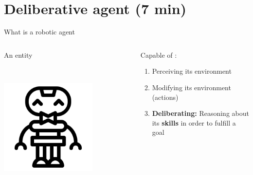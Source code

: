 \section{Deliberative agent (7 min)}

\begin{frame}{What is a robotic agent}

    \begin{columns}[T]
        \begin{column}{0.3\textwidth}
            An entity

            ~

            \includegraphics[width = 0.7\textwidth]{images/icons8-robot-gustav-500.png}
        \end{column}
        \begin{column}{0.7\textwidth}
            \center Capable of :
            \pause
            \begin{enumerate}
                \item Perceiving its environment
                \pause
                \item Modifying its environment (actions)
                \pause
                \item \textbf{Deliberating:} Reasoning about its \textbf{skills} in order to fulfill a goal
            \end{enumerate}
        \end{column}
    \end{columns}

 
\end{frame}

